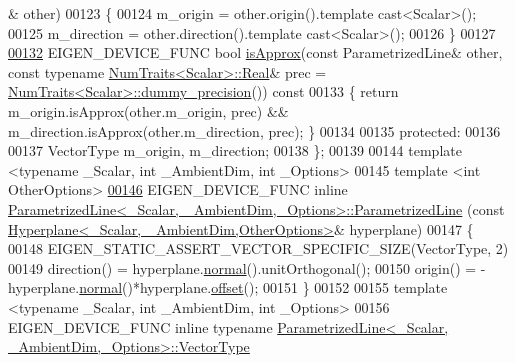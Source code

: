 \begin{DoxyCode}
      & other)
00123   \{
00124     m\_origin = other.origin().template cast<Scalar>();
00125     m\_direction = other.direction().template cast<Scalar>();
00126   \}
00127 
\hyperlink{group___geometry___module_a27a86c54f66a622847470f79aec4ea2f}{00132}   EIGEN\_DEVICE\_FUNC \textcolor{keywordtype}{bool} \hyperlink{group___geometry___module_a27a86c54f66a622847470f79aec4ea2f}{isApprox}(\textcolor{keyword}{const} ParametrizedLine& other, \textcolor{keyword}{const} \textcolor{keyword}{typename} 
      \hyperlink{group___core___module_struct_eigen_1_1_num_traits}{NumTraits<Scalar>::Real}& prec = 
      \hyperlink{group___core___module_struct_eigen_1_1_num_traits}{NumTraits<Scalar>::dummy\_precision}())\textcolor{keyword}{ const}
00133 \textcolor{keyword}{  }\{ \textcolor{keywordflow}{return} m\_origin.isApprox(other.m\_origin, prec) && m\_direction.isApprox(other.m\_direction, prec); \}
00134 
00135 \textcolor{keyword}{protected}:
00136 
00137   VectorType m\_origin, m\_direction;
00138 \};
00139 
00144 \textcolor{keyword}{template} <\textcolor{keyword}{typename} \_Scalar, \textcolor{keywordtype}{int} \_AmbientDim, \textcolor{keywordtype}{int} \_Options>
00145 \textcolor{keyword}{template} <\textcolor{keywordtype}{int} OtherOptions>
\hyperlink{group___geometry___module_a6b4a0e4a98ea57f3a2b2d5669d24e909}{00146} EIGEN\_DEVICE\_FUNC \textcolor{keyword}{inline} 
      \hyperlink{group___geometry___module_a7c23f36d93cf3b3c2b37fd9f9eda5685}{ParametrizedLine<\_Scalar, \_AmbientDim,\_Options>::ParametrizedLine}
      (\textcolor{keyword}{const} \hyperlink{group___geometry___module_class_eigen_1_1_hyperplane}{Hyperplane<\_Scalar, \_AmbientDim,OtherOptions>}& 
      hyperplane)
00147 \{
00148   EIGEN\_STATIC\_ASSERT\_VECTOR\_SPECIFIC\_SIZE(VectorType, 2)
00149   direction() = hyperplane.\hyperlink{group___geometry___module_ad3da930fc7025604f2f174651089b2a8}{normal}().unitOrthogonal();
00150   origin() = -hyperplane.\hyperlink{group___geometry___module_ad3da930fc7025604f2f174651089b2a8}{normal}()*hyperplane.\hyperlink{group___geometry___module_afe2eadf3679e4a802c0e02c15049aed9}{offset}();
00151 \}
00152 
00155 \textcolor{keyword}{template} <\textcolor{keyword}{typename} \_Scalar, \textcolor{keywordtype}{int} \_AmbientDim, \textcolor{keywordtype}{int} \_Options>
00156 EIGEN\_DEVICE\_FUNC \textcolor{keyword}{inline} \textcolor{keyword}{typename} 
      \hyperlink{group___core___module}{ParametrizedLine<\_Scalar, \_AmbientDim,\_Options>::VectorType}

\end{DoxyCode}
